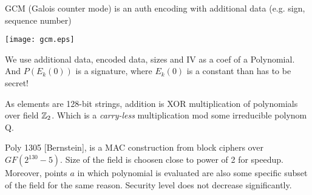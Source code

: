 \begin{definition}
	GCM (Galois counter mode) is an auth encoding with additional data (e.g. sign, sequence number)

	\texttt{[image: gcm.eps]}

	We use additional data, encoded data, sizes and IV as a coef of a Polynomial. And $P(E_k(0))$ is a signature, where $E_k(0)$ is a constant than has to be secret!

	As elements are 128-bit strings, addition is XOR multiplication of polynomials over field $\operatorname{\mathbb{Z}}_2$.
	Which is a \emph{carry-less} multiplication mod some irreducible polynom Q.
\end{definition}

\begin{example}
	Poly 1305 [Bernstein], is a MAC construction from block ciphers over $GF(2^{130} - 5)$.
	Size of the field is choosen close to power of 2 for speedup. Moreover, points $a$ in which polynomial is evaluated are also some specific subset of the field for the same reason.
	Security level does not decrease significantly.
\end{example}

